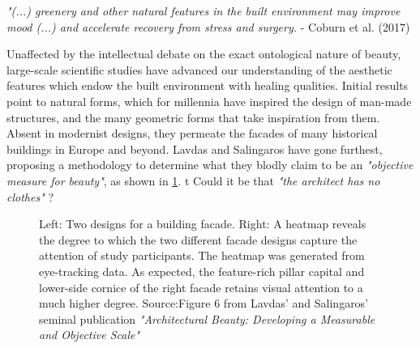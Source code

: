 \documentclass{article}
\begin{document}
\begin{multicols}{2}
\textit{"(...) greenery and other natural features in the built environment may improve mood (...) and accelerate recovery from stress and surgery.} \newline - Coburn et al. (2017) \cite{coburn_buildings_2017}

Unaffected by the intellectual debate on the exact ontological nature of beauty, large-scale scientific studies have advanced our understanding of the aesthetic features which endow the built environment with healing qualities. Initial results point to natural forms, which for millennia have inspired the design of man-made structures, and the many geometric forms that take inspiration from them. Absent in modernist designs, they permeate the facades of many historical buildings in Europe and beyond. Lavdas and Salingaros have gone furthest, proposing a methodology to determine what they blodly claim to be an \textit{"objective measure for beauty"}, as shown in \cref{fig:heatmap}. t Could it be that \textit{"the architect has no clothes"} \cite{mehaffy_architect_2011}?

\end{multicols}

\begin{figure}[H]
    \centering
     \hspace{2.5mm}
    \caption{Left: Two designs for a building facade. Right: A heatmap reveals the degree to which the two different facade designs capture the attention of study participants. The heatmap was generated from eye-tracking data. As expected, the feature-rich pillar capital and lower-side cornice of the right facade retains visual attention to a much higher degree. Source:Figure 6 from Lavdas' and Salingaros' seminal publication \textit{"Architectural Beauty: Developing a Measurable and Objective Scale"} \cite{lavdas_architectural_2022}}
    \label{fig:heatmap}
\end{figure}
\end{document}

